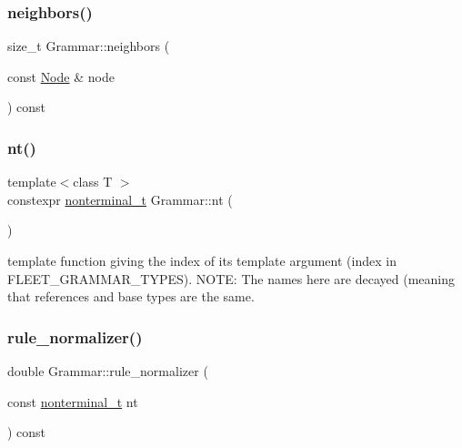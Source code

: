 \subsubsection{\texorpdfstring{neighbors()}{neighbors()}}
{\footnotesize\ttfamily size\+\_\+t Grammar\+::neighbors (\begin{DoxyParamCaption}\item[{const \hyperlink{class_node}{Node} \&}]{node }\end{DoxyParamCaption}) const\hspace{0.3cm}{\ttfamily [inline]}}

\mbox{\label{class_grammar_aa5c9afa0e7e1aa989b54402b02a677a3}} 
\subsubsection{\texorpdfstring{nt()}{nt()}}
{\footnotesize\ttfamily template$<$class T $>$ \\
constexpr \hyperlink{_nonterminal_8h_a5c1f658dc7560600a16d22408bd716ca}{nonterminal\+\_\+t} Grammar\+::nt (\begin{DoxyParamCaption}{ }\end{DoxyParamCaption})\hspace{0.3cm}{\ttfamily [inline]}}

template function giving the index of its template argument (index in F\+L\+E\+E\+T\+\_\+\+G\+R\+A\+M\+M\+A\+R\+\_\+\+T\+Y\+P\+ES). N\+O\+TE\+: The names here are decayed (meaning that references and base types are the same.\mbox{\label{class_grammar_a2182b3ded5171ba3e84be952176798e9}} 
\subsubsection{\texorpdfstring{rule\+\_\+normalizer()}{rule\_normalizer()}}
{\footnotesize\ttfamily double Grammar\+::rule\+\_\+normalizer (\begin{DoxyParamCaption}\item[{const \hyperlink{_nonterminal_8h_a5c1f658dc7560600a16d22408bd716ca}{nonterminal\+\_\+t}}]{nt }\end{DoxyParamCaption}) const\hspace{0.3cm}{\ttfamily [inline]}}

